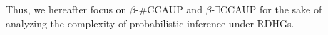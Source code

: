 \documentclass[letterpaper]{article} %
\newtheorem{observation}{Observation}
\begin{document}
Thus, we hereafter focus on $\beta$-\#CCAUP and $\beta$-$\exists$CCAUP for the sake of analyzing the complexity of probabilistic inference under RDHGs.







\end{document}
